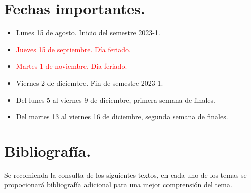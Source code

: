 \section{Fechas importantes.}

\begin{itemize}
\setlength\itemsep{1pt}
\item Lunes 15 de agosto. Inicio del semestre 2023-1.
\item \textcolor{red}{Jueves 15 de septiembre. Día feriado.}
\item \textcolor{red}{Martes 1 de noviembre. Día feriado.}
\item Viernes 2 de diciembre. Fin de semestre 2023-1.
\item Del lunes 5 al viernes 9 de diciembre, primera semana de finales.
\item Del martes 13 al viernes 16 de diciembre, segunda semana de finales.
\end{itemize}

\section{Bibliografía.}

Se recomienda la consulta de los siguientes textos, en cada uno de los temas se propocionará bibliografía adicional para una mejor comprensión del tema.
\nocite{*}
\printbibliography[keyword={computacional}, title={Referencias Física Computacional}]
\printbibliography[keyword={python}, title={Referencias pyhton, matplolib, jupyter}]


